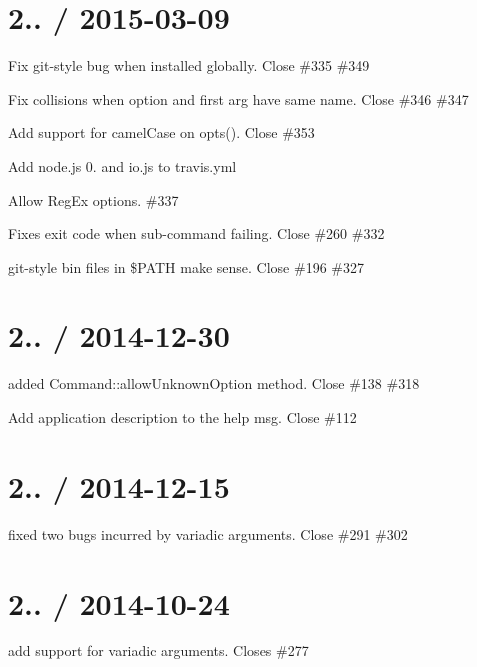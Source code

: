 \section*{2.. / 2015-\/03-\/09 }


\begin{DoxyItemize}
\item Fix git-\/style bug when installed globally. Close \#335 \#349 
\item Fix collisions when option and first arg have same name. Close \#346 \#347 
\item Add support for camel\+Case on {\ttfamily opts()}. Close \#353 
\item Add node.\+js 0. and io.\+js to travis.\+yml
\item Allow Reg\+Ex options. \#337 
\item Fixes exit code when sub-\/command failing. Close \#260 \#332 
\item git-\/style {\ttfamily bin} files in \$\+P\+A\+TH make sense. Close \#196 \#327 
\end{DoxyItemize}

\section*{2.. / 2014-\/12-\/30 }


\begin{DoxyItemize}
\item added {\ttfamily Command\+::allow\+Unknown\+Option} method. Close \#138 \#318  
\item Add application description to the help msg. Close \#112 
\end{DoxyItemize}

\section*{2.. / 2014-\/12-\/15 }


\begin{DoxyItemize}
\item fixed two bugs incurred by variadic arguments. Close \#291  \#302 
\end{DoxyItemize}

\section*{2.. / 2014-\/10-\/24 }


\begin{DoxyItemize}
\item add support for variadic arguments. Closes \#277 
\end{DoxyItemize}

